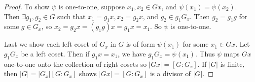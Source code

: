 \documentclass[a4paper,8pt]{article}
\begin{document}
\begin{outline}
\begin{proof}
      To show \(\psi\) is one-to-one, suppose \(x_1, x_2 \in Gx\), and \(\psi(x_1) = \psi(x_2)\). Then
      \(\exists g_1, g_2 \in G\) such that \(x_1 = g_1x, x_2 = g_2x\), and \(g_2 \in g_1G_x\). Then \(g_2 = g_1g\) for
      some \(g \in G_x\), so \(x_2 = g_2x = (g_1g)x = g_1x = x_1\). So \(\psi\) is one-to-one.

      Last we show each left coset of \(G_x\) in \(G\) is of form \(\psi(x_1)\) for some \(x_1 \in Gx\).
      Let \(g_1G_x\) be a left coset. Then if \(g_1x = x_1\), we have \(g_1G_x = \psi(x_1)\). Thus \(\psi\)
      maps \(Gx\) one-to-one onto the collection of right cosets so \(|Gx| = [G:G_x]\). If \(|G|\) is finite,
      then \(|G| = |G_x|[G:G_x]\) shows \(|Gx| = [G:G_x]\) is a divisor of \(|G|\).
    \end{proof}

\end{outline}
\end{document}
